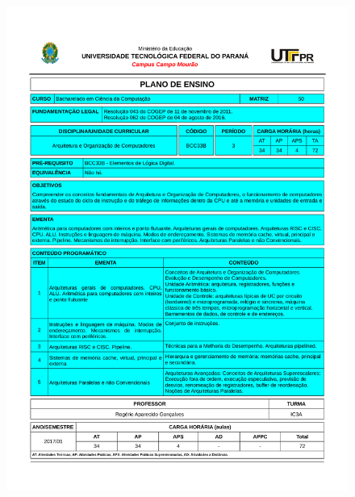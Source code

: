 \documentclass{beamer}
\begin{document}
\begin{frame}[allowframebreaks]
\begin{minipage}[t][\textheight][t]{\textwidth}
\begin{columns}
\begin{figure}
				\includegraphics[page=4,trim=2.0cm 3.0cm 2.0cm 3.0cm, scale=0.3]{figures/plano-ensino-BCC33B-IC3A}
			\end{figure}
		\end{columns}
	\end{minipage}
\end{frame}
\end{document}
